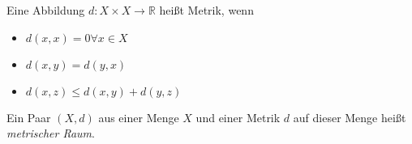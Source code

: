 
\begin{defn}[Metrik]
    Eine Abbildung $d: X \times X \to \mathbb{R}$ hei\ss{}t Metrik, wenn
    \begin{itemize}
    \item $d(x, x) = 0 \forall x \in X$
    \item $d(x, y) = d(y, x)$
    \item $d(x, z) \leq d(x, y) + d(y, z)$
    \end{itemize}
\end{defn}

\begin{beis}
\end{beis}

\begin{defn}
    Ein Paar $(X, d)$ aus einer Menge $X$ und einer Metrik $d$ auf dieser
    Menge hei\ss{}t \emph{metrischer Raum}.
\end{defn}
